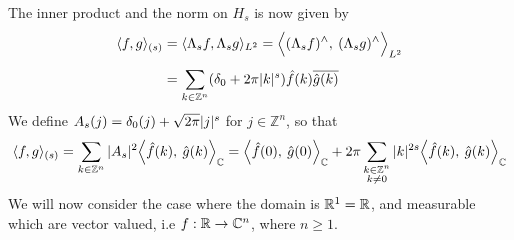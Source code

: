 \documentclass[../main-v2-manifolds.tex]{subfiles}
\begin{document}
The inner product and the norm on $H_s$ is now given by
\begin{align}
\langle f,g\rangle_{(s)} &= \langle \Lambda_s f,\Lambda_s g\rangle_{L^2} =\Big\langle {(\Lambda_s f)^{\wedge}},\: {(\Lambda_s g)^{\wedge}} \Big\rangle_{L^2}\nonumber\\[1ex]
&= \sum_{k\in\mathbb{Z}^n}(\delta_0 + 2\pi \vert {k} \vert^s)\hat{f}(k)\overline{\hat{g}(k)}\label{eq:hofer 1/2 inner product}
\end{align}
We define $A_s(j) = \delta_0(j) + \sqrt{2\pi}\vert {j} \vert^s$ for $j\in\mathbb{Z}^n$, so that
\begin{equation}
\langle f,g \rangle_{(s)} = \sum_{k\in\mathbb{Z}^n} \vert {A_s} \vert^2 \Big\langle {\hat{f}(k)},\: {\hat{g}(k)} \Big\rangle_{\mathbb{C}}= \Big\langle {\hat{f}(0)},\: {\hat{g}(0)} \Big\rangle_{\mathbb{C}} + 2\pi\sum_{\substack{k\in\mathbb{Z}^n\\k\neq 0}}\vert {k} \vert^{2s}\Big\langle {\hat{f}(k)},\: {\hat{g}(k)} \Big\rangle_{\mathbb{C}}\label{eq:hofer 1/2 norm}
\end{equation}
We will now consider the case where the domain is $\mathbb{R}^1 = \mathbb{R}$, and measurable which are vector valued, i.e $f: \mathbb{R}\to \mathbb{C}^n$, where $n\geq 1$.\\
\end{document}

